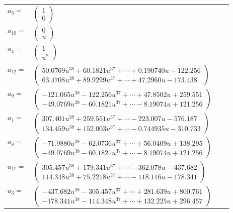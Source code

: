 \documentclass[1p]{elsarticle_modified}
\theoremstyle{definition}
\begin{document}
\begin{tabular}{m{7pt} m{180pt} m{7pt} m{180pt} }
\flushright $a_{5}=$&$\begin{pmatrix}1\\0\end{pmatrix}$ \\
\flushright $a_{10}=$&$\begin{pmatrix}0\\u\end{pmatrix}$ \\
\flushright $a_{4}=$&$\begin{pmatrix}1\\u^2\end{pmatrix}$ \\
\flushright $a_{12}=$&$\begin{pmatrix}50.0769 u^{38}+60.1821 u^{37}+\cdots+0.190740 u-122.256\\63.4708 u^{38}+89.9299 u^{37}+\cdots+47.2960 u-173.438\end{pmatrix}$ \\
\flushright $a_{9}=$&$\begin{pmatrix}-121.065 u^{38}-122.256 u^{37}+\cdots+47.8502 u+259.551\\-49.0769 u^{38}-60.1821 u^{37}+\cdots-8.19074 u+121.256\end{pmatrix}$ \\
\flushright $a_{1}=$&$\begin{pmatrix}307.401 u^{38}+259.551 u^{37}+\cdots-223.007 u-576.187\\134.459 u^{38}+152.003 u^{37}+\cdots-0.744935 u-310.733\end{pmatrix}$ \\
\flushright $a_{8}=$&$\begin{pmatrix}-71.9880 u^{38}-62.0736 u^{37}+\cdots+56.0409 u+138.295\\-49.0769 u^{38}-60.1821 u^{37}+\cdots-8.19074 u+121.256\end{pmatrix}$ \\
\flushright $a_{11}=$&$\begin{pmatrix}305.457 u^{38}+179.341 u^{37}+\cdots-362.078 u-437.682\\114.348 u^{38}+75.2218 u^{37}+\cdots-118.116 u-178.341\end{pmatrix}$ \\
\flushright $a_{3}=$&$\begin{pmatrix}-437.682 u^{38}-305.457 u^{37}+\cdots+281.639 u+800.761\\-178.341 u^{38}-114.348 u^{37}+\cdots+132.225 u+296.457\end{pmatrix}$ \\

\end{tabular}
\end{document}
